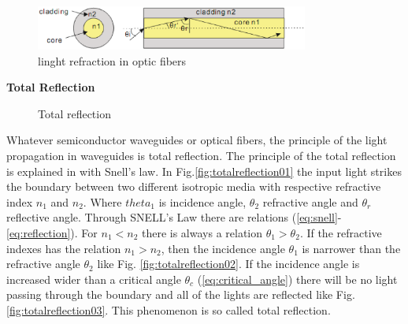 \begin{figure}[httbp]
\centering
\includegraphics[width=0.8\textwidth]{bilder/opticfiber}
\caption{linght refraction in optic fibers}
\label{fig:opticfiber}
\end{figure}
\textbf{ Total Reflection}\\
\begin{figure}[!ht]
\centering
{}
\hfill
{}
\hfill
{}
\caption{Total reflection}
\label{fig:totalreflection}
\end{figure}
Whatever semiconductor waveguides or optical fibers, the principle of the light propagation in waveguides is total reflection. The principle of the total reflection is explained in \cite{optical_waveguides_fibers} with Snell's law. In Fig.\ref{fig:totalreflection01} the input light strikes the boundary between two different isotropic media with respective refractive index $n_{1}$ and $n_{2}$. Where $theta_{1}$ is incidence angle, $\theta_{2}$ refractive angle and $\theta_{r}$ reflective angle. Through SNELL's Law there are relations (\ref{eq:snell}-\ref{eq:reflection}).  For $n_{1}<n_{2}$ there is  always a relation $\theta_{1}>\theta_{2}$.  If the refractive indexes has the relation $n_{1}>n_{2}$, then the incidence angle $\theta_{1}$ is narrower than the refractive angle $\theta_{2}$ like Fig. \ref{fig:totalreflection02}. If the incidence angle is increased wider than a critical angle $\theta_{c}$ (\ref{eq:critical_angle}) there will be no light passing through the boundary and all of the lights are reflected like Fig. \ref{fig:totalreflection03}. This phenomenon is so called total reflection.\\

